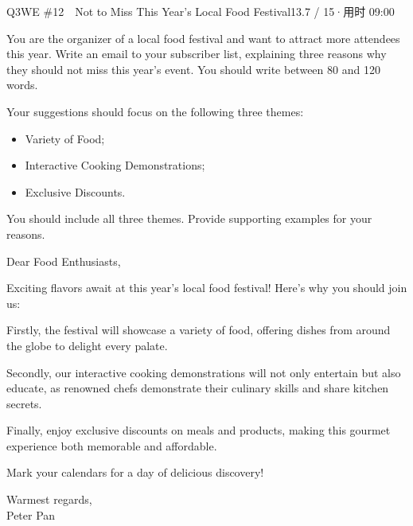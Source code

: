 \begin{qblock}{Q3\quad WE \#12\ \ Not to Miss This Year's Local Food Festival}{13.7 / 15\quad·\quad 用时 09:00}

\begin{promptbox}
You are the organizer of a local food festival and want to attract more attendees this year. Write an email to your subscriber list, explaining three reasons why they should not miss this year's event. You should write between 80 and 120 words.

\smallskip Your suggestions should focus on the following three themes:
\begin{itemize}[leftmargin=1.4em,topsep=2pt,itemsep=0pt]
  \item Variety of Food;
  \item Interactive Cooking Demonstrations;
  \item Exclusive Discounts.
\end{itemize}
You should include all three themes. Provide supporting examples for your reasons.
\end{promptbox}

\begin{modelbox}
Dear Food Enthusiasts,

Exciting flavors await at this year's local food festival! Here's why you should join us:

Firstly, the festival will showcase a variety of food, offering dishes from around the globe to delight every palate.

Secondly, our interactive cooking demonstrations will not only entertain but also educate, as renowned chefs demonstrate their culinary skills and share kitchen secrets.

Finally, enjoy exclusive discounts on meals and products, making this gourmet experience both memorable and affordable.

Mark your calendars for a day of delicious discovery!

Warmest regards,\\ Peter Pan
\end{modelbox}


\end{qblock}

